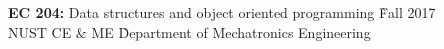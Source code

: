 \textbf{EC 204:} Data structures and object oriented programming
 \` Fall 2017 \\
NUST CE \& ME \`
Department of Mechatronics Engineering \\
